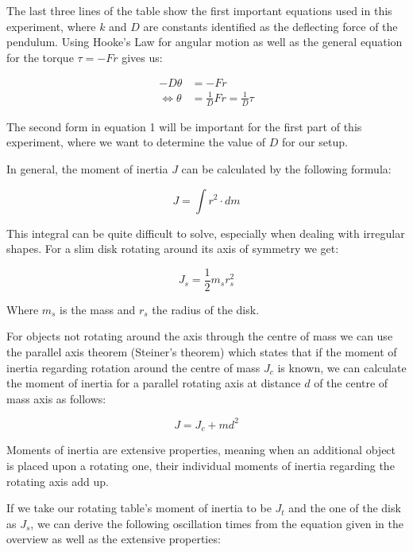 \documentclass{article}
\begin{document}
The last three lines of the table show the first important equations used in this experiment, where $k$ and $D$ are constants identified as the deflecting force of the pendulum. Using Hooke's Law for angular motion as well as the general equation for the torque $\tau = -Fr$ gives us:

\begin{equation}
    \begin{split}
        -D \theta &= -F r \\
        \iff \theta &= \frac{1}{D} Fr = \frac{1}{D} \tau 
    \end{split}
\end{equation}

The second form in equation 1 will be important for the first part of this experiment, where we want to determine the value of $D$ for our setup.

In general, the moment of inertia $J$ can be calculated by the following formula:

\begin{equation}
    J = \int r^2 \cdot dm
\end{equation}

This integral can be quite difficult to solve, especially when dealing with irregular shapes. For a slim disk rotating around its axis of symmetry we get:

\begin{equation}
    J_s=\frac{1}{2}m_sr_s^2
\end{equation}

Where $m_s$ is the mass and $r_s$ the radius of the disk.

For objects not rotating around the axis through the centre of mass we can use the parallel axis theorem (Steiner's theorem) which states that if the moment of inertia regarding rotation around the centre of mass $J_c$ is known, we can calculate the moment of inertia for a parallel rotating axis at distance $d$ of the centre of mass axis as follows:

\begin{equation}
    J=J_c+md^2
\end{equation}

Moments of inertia are extensive properties, meaning when an additional object is placed upon a rotating one, their individual moments of inertia regarding the rotating axis add up. 

\newpage

If we take our rotating table's moment of inertia to be $J_t$ and the one of the disk as $J_s$, we can derive the following oscillation times from the equation given in the overview as well as the extensive properties:
\end{document}
